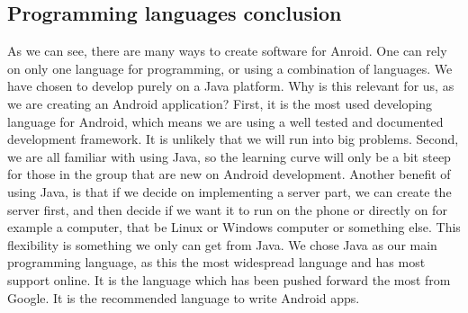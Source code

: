 

\subsection{Programming languages conclusion}

As we can see, there are many ways to create software for Anroid. One can rely on only one language for programming, or using a combination of languages. We have chosen to develop purely on a Java platform. Why is this relevant for us, as we are creating an Android application?
\newline
\newline
First, it is the most used developing language for Android, which means we are using a well tested and documented development framework. It is unlikely that we will run into big problems. Second, we are all familiar with using Java, so the learning curve will only be a bit steep for those in the group that are new on Android development.  Another benefit of using Java, is that if we decide on implementing a server part, we can create the server first, and then decide if we want it to run on the phone or directly on for example a computer, that be Linux or Windows computer or something else. This flexibility is something we only can get from Java.
\newline
\newline
We chose Java as our main programming language, as this the most widespread language and has most support online. It is the language which has been pushed forward the most from Google. It is the recommended language to write Android apps.


